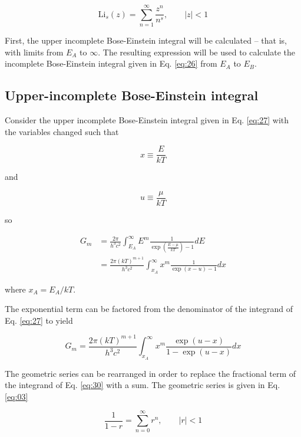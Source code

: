 \documentclass[letterpaper,12pt]{article}
\newcommand{\Li}{\textrm{Li}}
\begin{document}
\begin{equation} \label{eq:22}
\Li_{s}(z) = \sum_{n = 1}^{\infty} \frac{z^{n}}{n^{s}}, \qquad |z| < 1
\end{equation}

First, the upper incomplete Bose-Einstein integral will be calculated -- that is, with limits from $E_{A}$ to $\infty$. The resulting expression will be used to calculate the incomplete Bose-Einstein integral given in Eq. \ref{eq:26} from $E_{A}$ to $E_{B}$.


\subsection{Upper-incomplete Bose-Einstein integral}
Consider the upper incomplete Bose-Einstein integral given in Eq. \ref{eq:27} with the variables changed such that

\begin{equation} \label{eq:28}
x \equiv \frac{E}{kT}
\end{equation}

\noindent and

\begin{equation} \label{eq:29}
u \equiv \frac{\mu}{kT}
\end{equation}

\noindent so

\begin{align} \label{eq:27}
G_{m} &= \frac{2 \pi}{h^{3}c^{2}} \int_{E_{A}}^{\infty} E^{m} \frac{1}{\exp \left( \frac{E - \mu}{kT} \right) - 1} dE \nonumber \\
 &= \frac{2 \pi (kT)^{m+1}}{h^{3}c^{2}} \int_{x_{A}}^{\infty} x^{m} \frac{1}{\exp(x-u) - 1} dx
\end{align}

\noindent where $x_{A} = E_{A}/kT$.

The exponential term can be factored from the denominator of the integrand of Eq. \ref{eq:27} to yield

\begin{equation} \label{eq:30}
G_{m} = \frac{2 \pi (kT)^{m+1}}{h^{3}c^{2}} \int_{x_{A}}^{\infty} x^{m} \frac{\exp(u-x)}{1 - \exp(u-x)} dx
\end{equation}


The geometric series can be rearranged in order to replace the fractional term of the integrand of Eq. \ref{eq:30} with a sum. The geometric series is given in Eq. \ref{eq:03}

\begin{equation} \label{eq:03}
\frac{1}{1-r} = \sum_{n = 0}^{\infty} r^{n}, \qquad |r| < 1
\end{equation}
\end{document}

